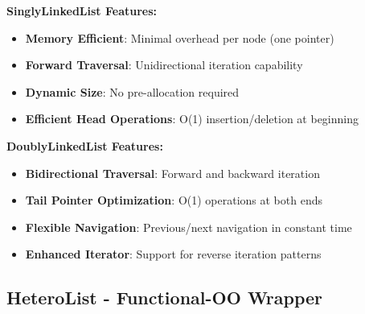 \documentclass[11pt,a4paper]{article}
\begin{document}
\textbf{SinglyLinkedList Features:}
\begin{itemize}
    \item \textbf{Memory Efficient}: Minimal overhead per node (one pointer)
    \item \textbf{Forward Traversal}: Unidirectional iteration capability
    \item \textbf{Dynamic Size}: No pre-allocation required
    \item \textbf{Efficient Head Operations}: O(1) insertion/deletion at beginning
\end{itemize}

\textbf{DoublyLinkedList Features:}
\begin{itemize}
    \item \textbf{Bidirectional Traversal}: Forward and backward iteration
    \item \textbf{Tail Pointer Optimization}: O(1) operations at both ends
    \item \textbf{Flexible Navigation}: Previous/next navigation in constant time
    \item \textbf{Enhanced Iterator}: Support for reverse iteration patterns
\end{itemize}

\subsection{HeteroList - Functional-OO Wrapper}
\end{document}
